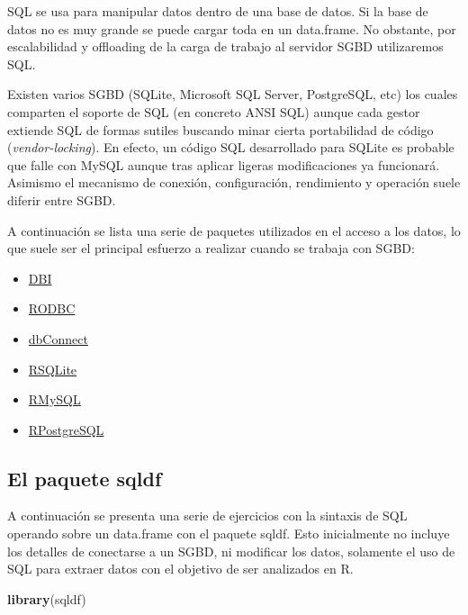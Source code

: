\documentclass[]{book}
\newenvironment{Shaded}{\begin{snugshade}}{\end{snugshade}}
\newcommand{\KeywordTok}[1]{\textcolor[rgb]{0.13,0.29,0.53}{\textbf{#1}}}
\newcommand{\NormalTok}[1]{#1}
\providecommand{\tightlist}{%
  \setlength{\itemsep}{0pt}\setlength{\parskip}{0pt}}
\begin{document}
SQL se usa para manipular datos dentro de una base de datos. Si la base de datos no es muy grande se puede cargar toda en un data.frame.
No obstante, por escalabilidad y offloading de la carga de trabajo al servidor SGBD utilizaremos SQL.

Existen varios SGBD (SQLite, Microsoft SQL Server, PostgreSQL, etc) los cuales comparten el soporte de SQL (en concreto ANSI SQL) aunque cada gestor extiende SQL
de formas sutiles buscando minar cierta portabilidad de código (\emph{vendor-locking}). En efecto, un código SQL desarrollado para SQLite es probable que falle con MySQL
aunque tras aplicar ligeras modificaciones ya funcionará. Asimismo el mecanismo de conexión, configuración, rendimiento y operación suele diferir entre SGBD.

A continuación se lista una serie de paquetes utilizados en el acceso a los datos, lo que suele ser el principal esfuerzo a realizar cuando se trabaja con SGBD:

\begin{itemize}
\tightlist
\item
  \href{https://cran.r-project.org/web/packages/DBI/index.html}{DBI}
\item
  \href{https://cran.r-project.org/web/packages/RODBC/index.html}{RODBC}
\item
  \href{https://cran.r-project.org/web/packages/dbConnect/index.html}{dbConnect}
\item
  \href{https://cran.r-project.org/web/packages/RSQLite/index.html}{RSQLite}
\item
  \href{https://cran.r-project.org/web/packages/RMySQL/index.html}{RMySQL}
\item
  \href{https://cran.r-project.org/web/packages/RPostgreSQL/index.html}{RPostgreSQL}
\end{itemize}

\hypertarget{el-paquete-sqldf}{%
\subsection{El paquete sqldf}\label{el-paquete-sqldf}}

A continuación se presenta una serie de ejercicios con la sintaxis de SQL operando sobre un data.frame con el paquete sqldf. Esto inicialmente no incluye los detalles de conectarse a un SGBD, ni modificar los
datos, solamente el uso de SQL para extraer datos con el objetivo de ser analizados en R.

\begin{Shaded}
\begin{Highlighting}[]
\KeywordTok{library}\NormalTok{(sqldf)}
\end{Highlighting}
\end{Shaded}
\end{document}
